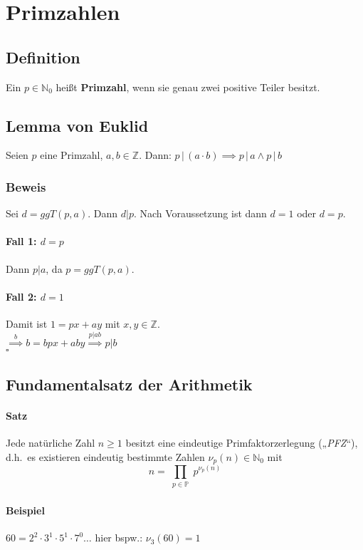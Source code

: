 \documentclass[14pt,a4paper]{article}
\newcommand{\N}{\ensuremath{\mathbb{N}}}
\newcommand{\Z}{\ensuremath{\mathbb{Z}}}
\newcommand{\Nzero}{\ensuremath{\N_0}}
\begin{document}
      \section{Primzahlen}
   	   \subsection{Definition}
   		   Ein $p \in \Nzero$ heißt \textbf{Primzahl}, wenn sie genau zwei positive Teiler besitzt.
   	   \subsection{Lemma von Euklid}
   		   Seien $p$ eine Primzahl, $a,b \in \Z$. Dann: $ p\,|\,(a \cdot b) \implies p\,|\,a \land p\,|\,b $

   		   \subsubsection{Beweis}
   			   Sei $ d = ggT(p,a) $. Dann $ d | p $. Nach Voraussetzung ist dann $ d = 1 $ oder $ d = p $.
   			   \paragraph{Fall 1: $d = p$}
   				   Dann $ p | a $, da $ p = ggT(p, a) $.
   			   \paragraph{Fall 2: $d = 1$}
   				   Damit ist $ 1 = px + ay $ mit $ x,y \in \Z $. \\
   				   $ \stackrel{b}{\implies} b = bpx + aby \stackrel{p | ab}{\implies} p | b $\\
   				   $ \square $
   	   \subsection{Fundamentalsatz der Arithmetik}
   		   \paragraph{Satz}
   			   Jede natürliche Zahl $n \ge 1$ besitzt eine eindeutige Primfaktorzerlegung („\textit{PFZ}“), d.h.\ es existieren eindeutig bestimmte Zahlen $ \nu_{p}(n) \in \Nzero $ mit $$ n = \prod_{\substack{p \in \mathbb{P}}} p^{\nu_{p}(n)}$$
   		   \paragraph{Beispiel}
   			   $ 60 = 2^2 \cdot 3^1 \cdot 5^1 \cdot 7^0 \dots $ \; hier bspw.: $ \nu_3(60) = 1 $
\end{document}
